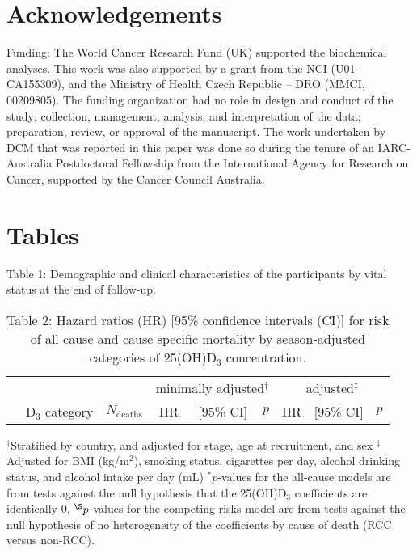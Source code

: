 \documentclass[a4paper,11pt]{article}
\begin{document}
\section*{Acknowledgements}
\noindent Funding:
The World Cancer Research Fund (UK) supported the biochemical analyses. This work was 
also supported by a grant from the NCI (U01-CA155309), and the Ministry of Health 
Czech Republic -- DRO (MMCI, 00209805). The funding organization had no role in 
design and conduct of the study; collection, management, analysis, and 
interpretation of the data; preparation, review, or approval of the manuscript. The 
work undertaken by DCM that was reported in this paper was done so during the tenure 
of an IARC-Australia Postdoctoral Fellowship from the International Agency for 
Research on Cancer, supported by the Cancer Council Australia. 

\clearpage




\clearpage
\section*{Tables}

\begin{table}
\small
\caption{Table 1: Demographic and clinical characteristics of the participants by 
vital status at the end of follow-up.}
\centering

\end{table}

\clearpage 
\begin{table}
\caption{Table 2: Hazard ratios (HR) [95\% confidence intervals (CI)] for risk of 
all cause and cause specific mortality by season-adjusted categories of 25(OH)D$_3$ 
concentration.}
\begin{tabular}{lrrrrrrrr}
\toprule
& & &\multicolumn{3}{c}{minimally adjusted$^\dag$} & 
\multicolumn{3}{c}{adjusted$^\ddag$} \\
 \cmidrule(r){4-6} \cmidrule(l){7-9} 
& D$_3$ category & $N_{\text{deaths}}$ & HR & [95\% CI] & $p$ & HR & [95\% CI] 
& 
$p$ \\
\midrule

\bottomrule
\end{tabular}
\newline
{\footnotesize 
$^\dag$Stratified by country, and adjusted for stage, age at 
recruitment, and sex \newline
$^\ddag$Adjusted for BMI (kg/m$^2$), smoking status, cigarettes 
per day, alcohol drinking status, and alcohol intake per day (mL) \newline
$^*p$-values for the all-cause models are from tests against the null 
hypothesis that the 25(OH)D$_3$ coefficients are identically 0. 
\newline
$^{\S}p$-values for the competing risks model are from tests against the null 
hypothesis of no heterogeneity of the coefficients by cause of death (RCC 
versus non-RCC).
}
\end{table}
\clearpage
\end{document}
